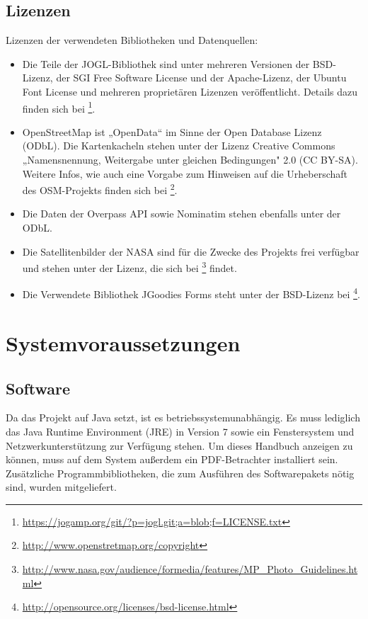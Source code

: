 \documentclass[10pt]{scrreprt}
\begin{document}
\vspace{3mm}
\section{Lizenzen}
Lizenzen der verwendeten Bibliotheken und Datenquellen:
\begin{itemize}
\item Die Teile der JOGL-Bibliothek sind unter mehreren Versionen der BSD-Lizenz, der SGI Free Software License und der Apache-Lizenz, der Ubuntu Font License und mehreren proprietären Lizenzen veröffentlicht. Details dazu finden sich bei  \footnote{\url{https://jogamp.org/git/?p=jogl.git;a=blob;f=LICENSE.txt}}.
\item OpenStreetMap ist „OpenData“ im Sinne der Open Database Lizenz (ODbL). Die Kartenkacheln stehen unter der Lizenz  Creative Commons „Namensnennung, Weitergabe unter gleichen Bedingungen" 2.0 (CC BY-SA). Weitere Infos, wie auch eine Vorgabe zum Hinweisen auf die Urheberschaft des OSM-Projekts finden sich bei \footnote{\url{http://www.openstretmap.org/copyright}}.
\item Die Daten der Overpass API sowie Nominatim stehen ebenfalls unter der ODbL.
\item Die Satellitenbilder der NASA sind für die Zwecke des Projekts frei verfügbar und stehen unter der Lizenz, die sich bei \footnote{\url{http://www.nasa.gov/audience/formedia/features/MP_Photo_Guidelines.html}} findet.
\item Die Verwendete Bibliothek JGoodies Forms steht unter der BSD-Lizenz bei \footnote{\url{http://opensource.org/licenses/bsd-license.html}}.
\end{itemize}




\chapter{Systemvoraussetzungen} 
\section{Software}
Da das Projekt auf Java setzt, ist es betriebssystemunabhängig. Es muss lediglich das Java Runtime Environment (JRE) in Version 7 sowie ein Fenstersystem und Netzwerkunterstützung zur Verfügung stehen. Um dieses Handbuch anzeigen zu können, muss auf dem System außerdem ein PDF-Betrachter installiert sein. Zusätzliche Programmbibliotheken, die zum Ausführen des Softwarepakets nötig sind, wurden mitgeliefert.\\
\end{document}
